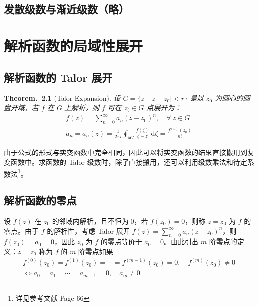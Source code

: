 \documentclass[UTF8]{report}
\theoremstyle{MyLineTheoremStyle} %
\theoremstyle{MyBlockTheoremStyle} %
\newtheorem{BlockTheorem}[LineTheorem]{Theorem.\,} %
\theoremstyle{MySubsubsectionStyle} %
\begin{document}
\section{发散级数与渐近级数（略）}

\chapter{解析函数的局域性展开}\thispagestyle{fancy}

\section{解析函数的 Talor 展开}

\begin{BlockTheorem}[Talor Expansion]\label{Talor Expansion}
设 $G = \{z \mid \left| z - z_0 \right| < r  \}$ 是以 $z_0$ 为圆心的圆盘开域，若 $f$ 在 $\overline{G}$ 上解析，则 $f$ 可在 $z_0 \in G$ 点展开为：
\begin{gather}
    f(z) = \sum_{n = 0}^{\infty} a_n (z - z_0)^n,\quad  \forall\ z \in G
    \\ 
    a_n = a_n(z) =\frac{1}{2 \pi i} \oint_{\partial G} \frac{f(\zeta)}{\zeta - z} \ \mathrm{d}\zeta  =  \frac{f^{(n)}(z_0)}{n!}
\end{gather}
\end{BlockTheorem}
由于公式的形式与实变函数中完全相同，因此可以将实变函数的结果直接搬用到复变函数中。求函数的 Talor 级数时，除了直接搬用，还可以利用级数乘法和待定系数法\footnote{详见参考文献 \cite{数学物理方法} Page 66}。

\section{解析函数的零点}

设 $f(z)$ 在 $z_0$ 的邻域内解析，且不恒为 0，若 $f(z_0) = 0$，则称 $z = z_0$ 为 $f$ 的零点。由于 $f$ 的解析性，考虑 Talor 展开 $f(z) = \sum_{n = 0}^{\infty} a_n (z - z_0)^n$，则 $f(z_0) = a_0 = 0$，因此 $z_0$ 为 $f$ 的零点等价于 $a_0 = 0$。由此引出 $m$ 阶零点的定义：$z = z_0$ 称为 $f$ 的 $m$ 阶零点如果
\begin{gather}
f^{(0)}(z_0) = f^{(1)}(z_0) = \cdots = f^{(m-1)}(z_0) = 0,\quad f^{(m)}(z_0) \ne 0 \\ 
\Longleftrightarrow a_0 = a_1 = \cdots = a_{m-1} = 0,\quad a_m \ne 0
\end{gather}
\end{document}
